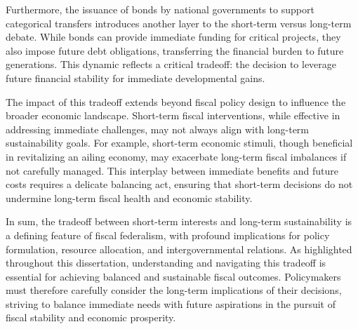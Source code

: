 Furthermore, the issuance of bonds by national governments to support categorical transfers introduces another layer to the short-term versus long-term debate. While bonds can provide immediate funding for critical projects, they also impose future debt obligations, transferring the financial burden to future generations. This dynamic reflects a critical tradeoff: the decision to leverage future financial stability for immediate developmental gains.

The impact of this tradeoff extends beyond fiscal policy design to influence the broader economic landscape. Short-term fiscal interventions, while effective in addressing immediate challenges, may not always align with long-term sustainability goals. For example, short-term economic stimuli, though beneficial in revitalizing an ailing economy, may exacerbate long-term fiscal imbalances if not carefully managed. This interplay between immediate benefits and future costs requires a delicate balancing act, ensuring that short-term decisions do not undermine long-term fiscal health and economic stability.

In sum, the tradeoff between short-term interests and long-term sustainability is a defining feature of fiscal federalism, with profound implications for policy formulation, resource allocation, and intergovernmental relations. As highlighted throughout this dissertation, understanding and navigating this tradeoff is essential for achieving balanced and sustainable fiscal outcomes. Policymakers must therefore carefully consider the long-term implications of their decisions, striving to balance immediate needs with future aspirations in the pursuit of fiscal stability and economic prosperity.


